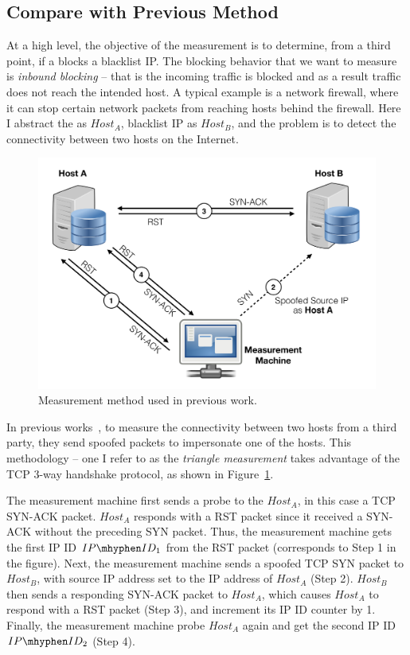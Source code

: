 \subsection{Compare with Previous Method}

At a high level, the objective of the measurement is to determine, from a third
point, if a {} blocks a blacklist IP. The blocking behavior that we
want to measure is \textit{inbound blocking} -- that is the incoming traffic
is blocked and as a result traffic does not reach the intended host. A
typical example is a network firewall, where it can stop certain network
packets from reaching hosts behind the firewall. Here I abstract the
{} as $Host_A$, blacklist IP as $Host_B$, and the problem is to
detect the connectivity between two hosts on the Internet.

\begin{figure}[t]
\centering
\includegraphics[width=0.8\columnwidth]{data_usage/images/croped_method_old.pdf}
\caption{Measurement method used in previous work.}
\label{fig:old_method}
\end{figure}

In previous works~\cite{pearce2017augur, ensafi2014detecting}, to measure
the connectivity between two hosts from a third party, they send spoofed packets
to impersonate one of the hosts. This methodology -- one I refer
to as the \textit{triangle measurement} takes advantage of the TCP 3-way
handshake protocol, as shown in Figure~\ref{fig:old_method}.

The measurement machine first sends a probe to the $Host_A$, in this case a TCP
SYN-ACK packet. $Host_A$ responds with a RST packet since it received a SYN-ACK
without the preceding SYN packet. Thus, the measurement machine gets the
first IP ID $IP\mhyphen ID_1$ from the RST packet (corresponds to Step 1 in
the figure). Next, the measurement machine sends a spoofed TCP SYN packet to
$Host_B$, with source IP address set to the IP address of $Host_A$ (Step 2).
$Host_B$ then sends a responding SYN-ACK packet to $Host_A$, which causes $Host_A$
to respond with a RST packet (Step 3), and increment its IP ID counter by 1.
Finally, the measurement machine probe $Host_A$ again and get the second IP ID
$IP\mhyphen ID_2$ (Step 4).

